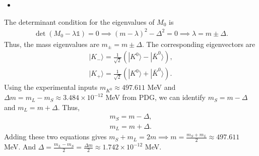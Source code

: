 \answer{}
\begin{itemize}
    \item [(a)]
\end{itemize}
The determinant condition for the eigenvalues of $M_0$ is
\begin{align}
    \det(M_0 - \lambda \mathbb{1}) = 0 \implies (m-\lambda)^2 - \Delta^2 = 0 \implies \lambda = m \pm \Delta.
\end{align}
Thus, the mass eigenvalues are $m_\pm = m \pm \Delta$. The corresponding eigenvectors are
\begin{align}
    |K_-\rangle = \frac{1}{\sqrt{2}}(|K^0\rangle - |\bar{K}^0\rangle), \\
    |K_+\rangle = \frac{1}{\sqrt{2}}(|K^0\rangle + |\bar{K}^0\rangle).
\end{align}
Using the experimental inputs $m_{K^0} \approx 497.611$ MeV and $\Delta m = m_L - m_S \approx 3.484 \times 10^{-12}$ MeV from PDG, we can identify $m_S = m - \Delta$ and $m_L = m + \Delta$. Thus,
\begin{align}
    m_S = m - \Delta, \\
    m_L = m + \Delta.
\end{align}
Adding these two equations gives $m_S + m_L = 2m \implies m = \frac{m_S + m_L}{2} \approx 497.611$ MeV. And $\Delta = \frac{m_L - m_S}{2} = \frac{\Delta m}{2} \approx 1.742 \times 10^{-12}$ MeV. 

